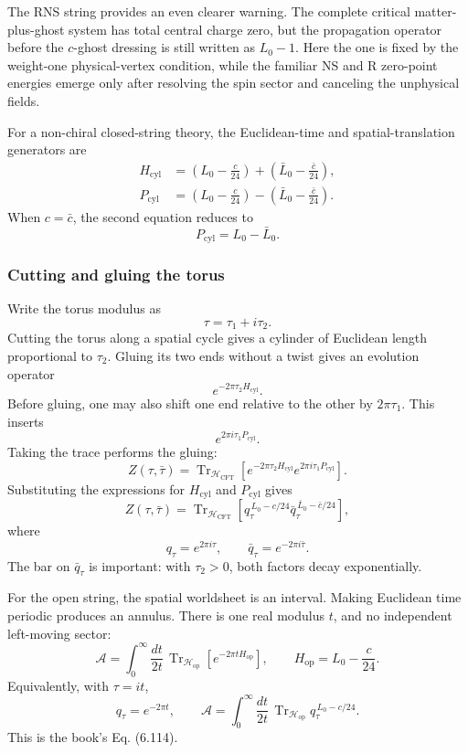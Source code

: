\documentclass[
  10pt,
  a4paper,
  openany]{book}
\begin{document}
The RNS string provides an even clearer warning. The complete critical
matter-plus-ghost system has total central charge zero, but the
propagation operator before the \(c\)-ghost dressing is still written as
\(L_0-1\). Here the one is fixed by the weight-one physical-vertex
condition, while the familiar NS and R zero-point energies emerge only
after resolving the spin sector and canceling the unphysical fields.

For a non-chiral closed-string theory, the Euclidean-time and
spatial-translation generators are \[
\begin{aligned}
H_{\mathrm{cyl}}
&=
\left(L_0-\frac{c}{24}\right)
+
\left(\bar L_0-\frac{\bar c}{24}\right),\\%
P_{\mathrm{cyl}}
&=
\left(L_0-\frac{c}{24}\right)
-
\left(\bar L_0-\frac{\bar c}{24}\right).
\end{aligned}
\] When \(c=\bar c\), the second equation reduces to \[
P_{\mathrm{cyl}}=L_0-\bar L_0.
\]

\subsubsection{Cutting and gluing the
torus}\label{cutting-and-gluing-the-torus}

Write the torus modulus as \[
\tau=\tau_1+i\tau_2.
\] Cutting the torus along a spatial cycle gives a cylinder of Euclidean
length proportional to \(\tau_2\). Gluing its two ends without a twist
gives an evolution operator \[
e^{-2\pi\tau_2H_{\mathrm{cyl}}}.
\] Before gluing, one may also shift one end relative to the other by
\(2\pi\tau_1\). This inserts \[
e^{2\pi i\tau_1P_{\mathrm{cyl}}}.
\] Taking the trace performs the gluing: \[
Z(\tau,\bar\tau)
=
\operatorname{Tr}_{\mathcal H_{\mathrm{CFT}}}
\left[
e^{-2\pi\tau_2H_{\mathrm{cyl}}}
e^{2\pi i\tau_1P_{\mathrm{cyl}}}
\right].
\] Substituting the expressions for \(H_{\mathrm{cyl}}\) and
\(P_{\mathrm{cyl}}\) gives \[
\boxed{
Z(\tau,\bar\tau)
=
\operatorname{Tr}_{\mathcal H_{\mathrm{CFT}}}
\left[
q_\tau^{\,L_0-c/24}
\bar q_\tau^{\,\bar L_0-\bar c/24}
\right],
}
\] where \[
q_\tau=e^{2\pi i\tau},
\qquad
\bar q_\tau=e^{-2\pi i\bar\tau}.
\] The bar on \(\bar q_\tau\) is important: with \(\tau_2>0\), both
factors decay exponentially.

For the open string, the spatial worldsheet is an interval. Making
Euclidean time periodic produces an annulus. There is one real modulus
\(t\), and no independent left-moving sector: \[
\boxed{
\mathcal A
=
\int_0^\infty\frac{dt}{2t}\,
\operatorname{Tr}_{\mathcal H_{\mathrm{op}}}
\left[
e^{-2\pi tH_{\mathrm{op}}}
\right],
\qquad
H_{\mathrm{op}}=L_0-\frac{c}{24}.
}
\] Equivalently, with \(\tau=it\), \[
q_\tau=e^{-2\pi t},
\qquad
\mathcal A
=
\int_0^\infty\frac{dt}{2t}\,
\operatorname{Tr}_{\mathcal H_{\mathrm{op}}}
q_\tau^{\,L_0-c/24}.
\] This is the book's Eq. (6.114).
\end{document}
